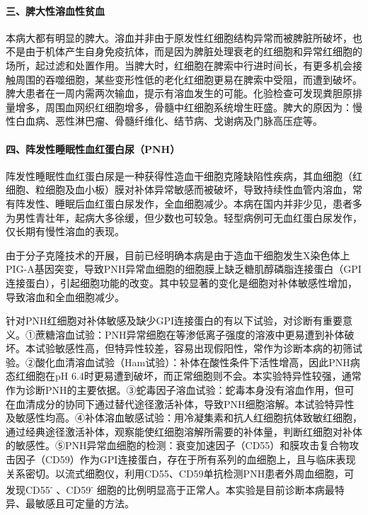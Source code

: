 \paragraph{三、脾大性溶血性贫血}

本病大都有明显的脾大。溶血并非由于原发性红细胞结构异常而被脾脏所破坏，也不是由于机体产生自身免疫抗体，而是因为脾脏处理衰老的红细胞和异常红细胞的场所，起过滤和处置作用。当脾大时，红细胞在脾索中行进时间长，有更多机会接触周围的吞噬细胞，某些变形性低的老化红细胞更易在脾索中受阻，而遭到破坏。脾大患者在一周内需两次输血，提示有溶血发生的可能。化验检查可发现粪胆原排量增多，周围血网织红细胞增多，骨髓中红细胞系统增生旺盛。脾大的原因为：慢性白血病、恶性淋巴瘤、骨髓纤维化、结节病、戈谢病及门脉高压症等。

\paragraph{四、阵发性睡眠性血红蛋白尿（PNH）}

阵发性睡眠性血红蛋白尿是一种获得性造血干细胞克隆缺陷性疾病，其血细胞（红细胞、粒细胞及血小板）膜对补体异常敏感而被破坏，导致持续性血管内溶血，常有阵发性、睡眠后血红蛋白尿发作，全血细胞减少。本病在国内并非少见，患者多为男性青壮年，起病大多徐缓，但少数也可较急。轻型病例可无血红蛋白尿发作，仅长期有慢性溶血的表现。

由于分子克隆技术的开展，目前已经明确本病是由于造血干细胞发生X染色体上PIG-A基因突变，导致PNH异常血细胞的细胞膜上缺乏糖肌醇磷脂连接蛋白（GPI连接蛋白），引起细胞功能的改变。其中较显著的变化是细胞对补体敏感性增加，导致溶血和全血细胞减少。

针对PNH红细胞对补体敏感及缺少GPI连接蛋白的有以下试验，对诊断有重要意义。①蔗糖溶血试验：PNH异常细胞在等渗低离子强度的溶液中更易遭到补体破坏。本试验敏感性高，但特异性较差，容易出现假阳性，常作为诊断本病的初筛试验。②酸化血清溶血试验（Ham试验）：补体在酸性条件下活性增高，因此PNH病态红细胞在pH
6.4时更易遭到破坏，而正常细胞则不会。本实验特异性较强，通常作为诊断PNH的主要依据。③蛇毒因子溶血试验：蛇毒本身没有溶血作用，但可在血清成分的协同下通过替代途径激活补体，导致PNH细胞溶解。本试验特异性及敏感性均高。④补体溶血敏感试验：用冷凝集素和抗人红细胞抗体致敏红细胞，通过经典途径激活补体，观察能使红细胞溶解所需要的补体量，判断红细胞对补体的敏感性。⑤PNH异常血细胞的检测：衰变加速因子（CD55）和膜攻击复合物攻击因子（CD59）作为GPI连接蛋白，存在于所有系列的血细胞上，且与临床表现关系密切。以流式细胞仪，利用CD55、CD59单抗检测PNH患者外周血细胞，可发现CD55\textsuperscript{-}
、CD59\textsuperscript{-}
细胞的比例明显高于正常人。本实验是目前诊断本病最特异、最敏感且可定量的方法。

